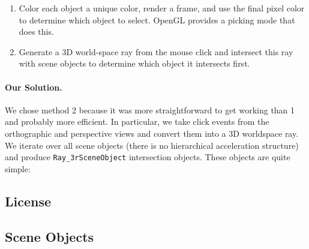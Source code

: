 \begin{enumerate}
  \item Color each object a unique color, render a frame, and use the
  final pixel color to determine which object to select. OpenGL provides a
  picking mode that does this.
  \item Generate a 3D world-space ray from the mouse click and intersect this
  ray with scene objects to determine which object it intersects first. 
\end{enumerate}

\paragraph{Our Solution.} We chose method 2 because it was more straightforward
to get working than 1 and probably more efficient. In particular, we take click
events from the orthographic and perspective views and convert them into a 3D
worldspace ray. We iterate over all scene objects (there is no hierarchical
acceleration structure) and produce \texttt{Ray\_3rSceneObject} intersection
objects. These objects are quite simple:

\subsection{License}\label{appdx:license}

\subsection{Scene Objects}\label{appdx:scene-objects}

% 
% 
% 
% 
% 
% 
% 
% 

